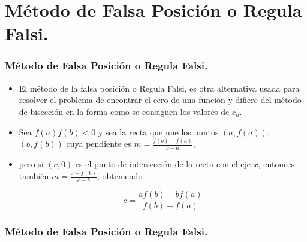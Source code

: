 \documentclass{beamer}
\begin{document}
\section{M\'etodo de Falsa Posici\'on o Regula Falsi.}
\begin{frame}[fragile]
  \frametitle{M\'etodo de Falsa Posici\'on o Regula Falsi.}
  \begin{itemize}
    \item El m\'etodo de la falsa posici\'on o Regula Falsi, es otra alternativa usada para resolver el problema de encontrar el
    cero de una funci\'on y difiere del m\'etodo de bisecci\'on en la forma como se consiguen los valores de $c_n$.
    \item<2-> Sea $f(a)f(b) < 0$ y sea la recta que une los puntos $(a, f (a))$, $(b, f (b))$ cuya pendiente es $m =
    \frac{f(b)-f(a)}{b-a}$,
    \item<3-> pero si $(c, 0)$ es el punto de intersecci\'on de la recta con el eje $x$, entonces tambi\'en $m = \frac{0 - f(b)}{c-b}$, obteniendo
    \begin{block}{}      
      $$
        c = \frac{af(b)-bf(a)}{f(b)-f(a)}
      $$
    \end{block}    
  \end{itemize}
\end{frame}
\begin{frame}
  \frametitle{M\'etodo de Falsa Posici\'on o Regula Falsi.}
  
\end{frame}
\end{document}
